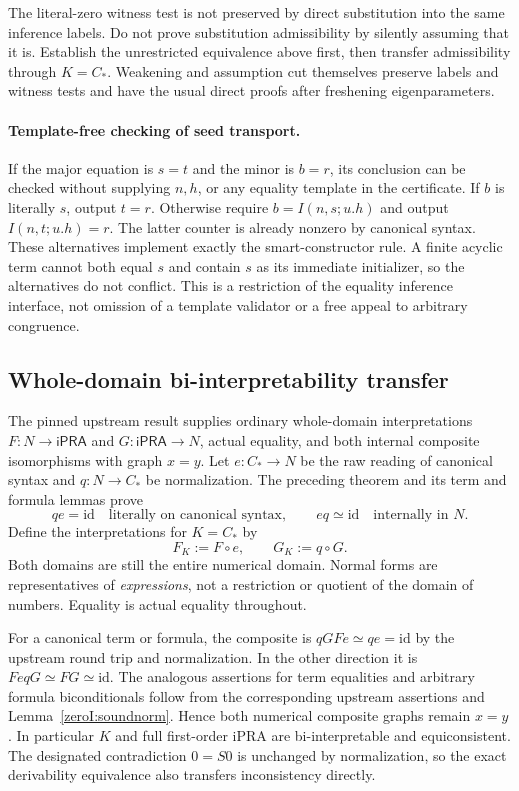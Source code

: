 The literal-zero witness test is not preserved by direct substitution
into the same inference labels.  Do not prove substitution admissibility
by silently assuming that it is.  Establish the unrestricted equivalence
above first, then transfer admissibility through $K=C_*$.  Weakening and
assumption cut themselves preserve labels and witness tests and have the
usual direct proofs after freshening eigenparameters.

\paragraph{Template-free checking of seed transport.}
If the major equation is $s=t$ and the minor is $b=r$, its conclusion can
be checked without supplying $n,h$, or any equality template in the
certificate.  If $b$ is literally $s$, output $t=r$.  Otherwise require
$b=I(n,s;u.h)$ and output $I(n,t;u.h)=r$.  The latter counter is already
nonzero by canonical syntax.  These alternatives implement exactly the
smart-constructor rule.  A finite acyclic term cannot both equal $s$ and
contain $s$ as its immediate initializer, so the alternatives do not
conflict.  This is a restriction of the equality inference interface,
not omission of a template validator or a free appeal to arbitrary
congruence.

\subsection{Whole-domain bi-interpretability transfer}

The pinned upstream result supplies ordinary whole-domain interpretations
$F:N\to\mathsf{iPRA}$ and $G:\mathsf{iPRA}\to N$, actual equality,
and both internal composite isomorphisms with graph $x=y$.  Let
$e:C_*\to N$ be the raw reading of canonical syntax and
$q:N\to C_*$ be normalization.  The preceding theorem and its term
and formula lemmas prove
\[
 qe=\mathrm{id}\quad\text{literally on canonical syntax},
 \qquad eq\simeq\mathrm{id}\quad\text{internally in }N.
\]
Define the interpretations for $K=C_*$ by
\[
 F_K:=F\circ e,\qquad G_K:=q\circ G.
\]
Both domains are still the entire numerical domain.  Normal forms are
representatives of \emph{expressions}, not a restriction or quotient of
the domain of numbers.  Equality is actual equality throughout.

For a canonical term or formula, the composite is
$qGFe\simeq qe=\mathrm{id}$ by the upstream round trip and
normalization.  In the other direction it is
$FeqG\simeq FG\simeq\mathrm{id}$.  The analogous assertions for term
equalities and arbitrary formula biconditionals follow from the
corresponding upstream assertions and
Lemma~\ref{zeroI:soundnorm}.  Hence both numerical composite graphs
remain $x=y$.  In particular $K$ and full first-order iPRA are
bi-interpretable and equiconsistent.  The designated contradiction
$0=S0$ is unchanged by normalization, so the exact derivability
equivalence also transfers inconsistency directly.

